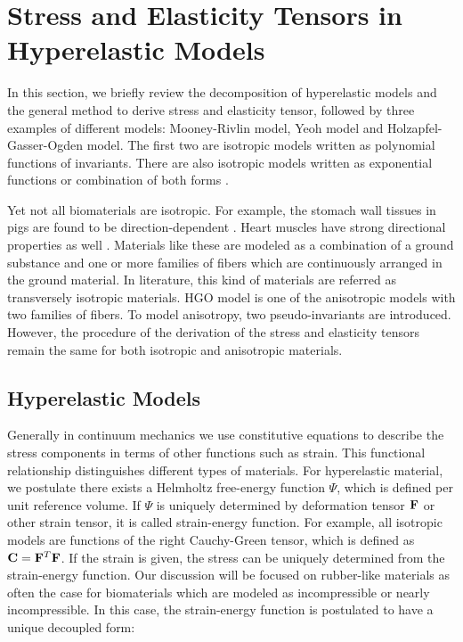 \section{Stress and Elasticity Tensors in Hyperelastic Models} \label{general}
In this section, we briefly review the decomposition of hyperelastic models and the general method to derive stress and elasticity tensor, followed by three examples of different models: Mooney-Rivlin model, Yeoh model and Holzapfel-Gasser-Ogden model. The first two are isotropic models written as polynomial functions of invariants. There are also isotropic models written as exponential functions or combination of both forms \cite{Fung5, Demiray, Westmann}. 

Yet not all biomaterials are isotropic. For example, the stomach wall tissues in pigs are found to be direction-dependent \cite{Zhao}. Heart muscles have strong directional properties as well \cite{Ramesh}. Materials like these are modeled as a combination of a ground substance and one or more families of fibers which are continuously arranged in the ground material. In literature, this kind of materials are referred as transversely isotropic materials. HGO model is one of the anisotropic models with two families of fibers. To model anisotropy, two pseudo-invariants are introduced. However, the procedure of the derivation of the stress and elasticity tensors remain the same for both isotropic and anisotropic materials.

%
\subsection{Hyperelastic Models}
Generally in continuum mechanics we use constitutive equations to describe the stress components in terms of other functions such as strain. This functional relationship distinguishes different types of materials. For hyperelastic material, we postulate there exists a Helmholtz free-energy function $\Psi$, which is defined per unit reference volume. If $\Psi$ is uniquely determined by deformation tensor $\bold{F}$ or other strain tensor, it is called strain-energy function. For example, all isotropic models are functions of the right Cauchy-Green tensor, which is defined as $\bold{C} = {\bold{F}}^T{\bold{F}}$. If the strain is given, the stress can be uniquely determined from the strain-energy function. Our discussion will be focused on rubber-like materials as often the case for biomaterials which are modeled as incompressible or nearly incompressible. In this case, the strain-energy function is postulated to have a unique decoupled form:

